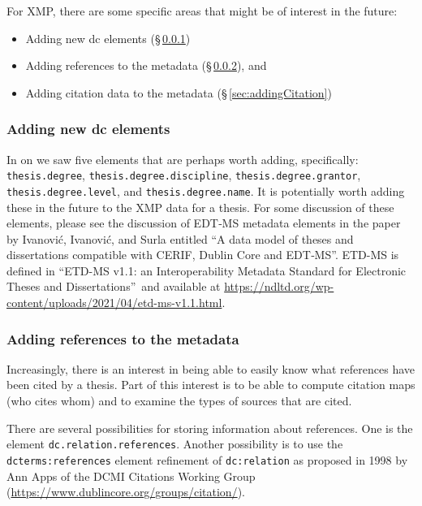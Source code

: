 For XMP, there are some specific areas that might be of interest in the future:
\begin{itemize}
  \item Adding new dc elements (§\,\ref{sec:newDCelements}) 
  \item Adding references to the metadata (§\,\ref{sec:addingReferences}), and 
  \item Adding citation data to the metadata (§\,\ref{sec:addingCitation})
\end{itemize}

\subsubsection{Adding new dc elements}
\label{sec:newDCelements}
In  on \pageref{tab:dublicCoreDigitalCommons} we saw five elements that are perhaps worth adding, specifically:
\texttt{thesis.degree}, \texttt{thesis.degree.discipline}, \linebreak[4]\texttt{thesis.degree.grantor}, \texttt{thesis.degree.level}, and \linebreak[4] \texttt{thesis.degree.name}. It is potentially worth adding these in the future to the XMP data for a thesis. For some discussion of these elements, please see the discussion of EDT‐MS metadata elements in the paper by Ivanović, Ivanović, and Surla entitled ``A data model of theses and dissertations compatible with {CERIF}, {Dublin} {Core} and {EDT}‐{MS}''\cite{ivanovic_data_2012}. ETD-MS is defined in ``ETD-MS v1.1: an Interoperability Metadata Standard for Electronic Theses and Dissertations''\,\cite{hickey_pavani_suleman_2010} and available at \url{https://ndltd.org/wp-content/uploads/2021/04/etd-ms-v1.1.html}.


\subsubsection{Adding references to the metadata}
\label{sec:addingReferences}
Increasingly, there is an interest in being able to easily know what references have been cited by a thesis. Part of this interest is to be able to compute citation maps (who cites whom) and to examine the types of sources that are cited.

There are several possibilities for storing information about references. One is the element \texttt{dc.relation.references}. Another possibility is to use the \texttt{dcterms:references} element refinement of \texttt{dc:relation} as proposed in 1998 by Ann Apps of the DCMI Citations Working Group (\url{https://www.dublincore.org/groups/citation/}).


